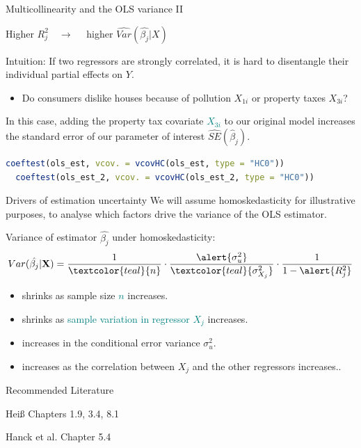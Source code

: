 \documentclass[11pt, aspectratio = 169]{beamer}
\begin{document}
\begin{frame}[fragile]{Multicollinearity and the OLS variance II}
\begin{center}
  Higher $R_{j}^2 \quad \rightarrow \quad$ higher $\hat{Var}(\hat{\beta_{j}} |X)$
\end{center}
\pause
Intuition: If two regressors are strongly correlated, it is hard to disentangle their individual partial effects on $Y$.
\begin{itemize}
    \item[$\rightarrow$] Do consumers dislike houses because of pollution $X_{1i}$ or property taxes $X_{3i}$?
\end{itemize}
\pause
In this case, adding the property tax covariate \textcolor{teal}{$X_{3i}$} to our original model \alert{increases} the standard error of our parameter of interest \alert{$\hat{SE}(\hat{\beta}_j)$}.
\begin{lstlisting}[language=R]      
  coeftest(ols_est, vcov. = vcovHC(ols_est, type = "HC0"))
  coeftest(ols_est_2, vcov. = vcovHC(ols_est_2, type = "HC0"))
\end{lstlisting}
\end{frame}

\begin{frame}{Drivers of estimation uncertainty}
We will assume homoskedasticity for illustrative purposes, to analyse which factors drive the variance of the OLS estimator.

Variance of estimator $\hat{\beta_j}$ under homoskedasticity:
\begin{align*}
    Var(\hat{\beta_j}|\mathbf{X}) = \frac{1}{\textcolor{teal}{n}} \cdot \frac{\alert{\sigma_u^2}}{\textcolor{teal}{\sigma_{X_j}^2}} \cdot \frac{1}{1-\alert{R_j^2}}
\end{align*}
\pause
  \begin{itemize}
     \item shrinks as sample size \textcolor{teal}{$n$} increases.
     \item shrinks as \textcolor{teal}{sample variation in regressor $X_j$} increases. \pause
     \item increases in the conditional error variance \alert{$\sigma_u^2$}.
    \item increases as the \alert{correlation between $X_j$ and the other regressors} increases..
 \end{itemize}
\end{frame}

\begin{frame}{Recommended Literature}

Heiß Chapters 1.9, 3.4, 8.1

Hanck et al. Chapter 5.4
   
\end{frame}
\end{document}
